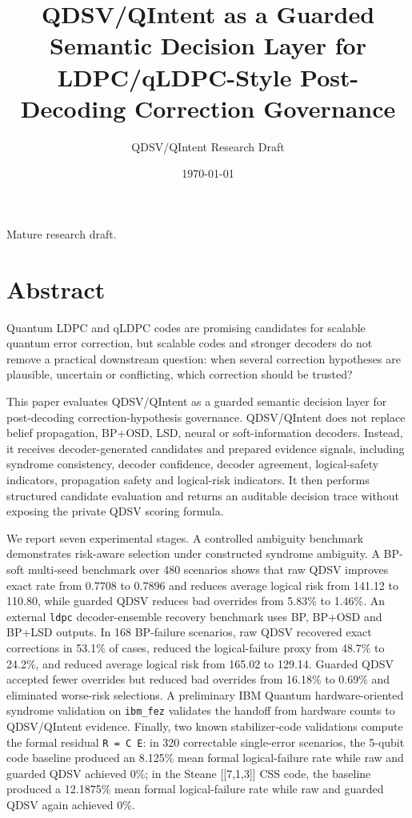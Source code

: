\documentclass[11pt]{article}
\title{QDSV/QIntent as a Guarded Semantic Decision Layer for LDPC/qLDPC-Style Post-Decoding Correction Governance}
\author{QDSV/QIntent Research Draft}
\date{\today}
\begin{document}
\maketitle


Mature research draft.


\section{Abstract}

Quantum LDPC and qLDPC codes are promising candidates for scalable quantum error correction, but scalable codes and stronger decoders do not remove a practical downstream question: when several correction hypotheses are plausible, uncertain or conflicting, which correction should be trusted?


This paper evaluates QDSV/QIntent as a guarded semantic decision layer for post-decoding correction-hypothesis governance. QDSV/QIntent does not replace belief propagation, BP+OSD, LSD, neural or soft-information decoders. Instead, it receives decoder-generated candidates and prepared evidence signals, including syndrome consistency, decoder confidence, decoder agreement, logical-safety indicators, propagation safety and logical-risk indicators. It then performs structured candidate evaluation and returns an auditable decision trace without exposing the private QDSV scoring formula.


We report seven experimental stages. A controlled ambiguity benchmark demonstrates risk-aware selection under constructed syndrome ambiguity. A BP-soft multi-seed benchmark over 480 scenarios shows that raw QDSV improves exact rate from 0.7708 to 0.7896 and reduces average logical risk from 141.12 to 110.80, while guarded QDSV reduces bad overrides from 5.83\% to 1.46\%. An external \texttt{ldpc} decoder-ensemble recovery benchmark uses BP, BP+OSD and BP+LSD outputs. In 168 BP-failure scenarios, raw QDSV recovered exact corrections in 53.1\% of cases, reduced the logical-failure proxy from 48.7\% to 24.2\%, and reduced average logical risk from 165.02 to 129.14. Guarded QDSV accepted fewer overrides but reduced bad overrides from 16.18\% to 0.69\% and eliminated worse-risk selections. A preliminary IBM Quantum hardware-oriented syndrome validation on \texttt{ibm\_fez} validates the handoff from hardware counts to QDSV/QIntent evidence. Finally, two known stabilizer-code validations compute the formal residual \texttt{R = C E}: in 320 correctable single-error scenarios, the 5-qubit code baseline produced an 8.125\% mean formal logical-failure rate while raw and guarded QDSV achieved 0\%; in the Steane [[7,1,3]] CSS code, the baseline produced a 12.1875\% mean formal logical-failure rate while raw and guarded QDSV again achieved 0\%.
\end{document}
